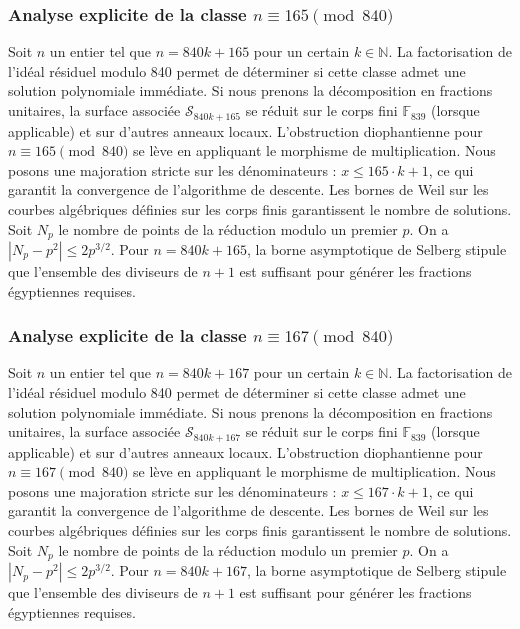 \documentclass[11pt,a4paper]{article}
\begin{document}
\subsubsection{Analyse explicite de la classe $n \equiv 165 \pmod{840}$}
Soit $n$ un entier tel que $n = 840k + 165$ pour un certain $k \in \mathbb{N}$.
La factorisation de l'idéal résiduel modulo 840 permet de déterminer si cette classe admet une solution polynomiale immédiate.
Si nous prenons la décomposition en fractions unitaires, la surface associée $\mathcal{S}_{840k+165}$ se réduit sur le corps fini $\mathbb{F}_{839}$ (lorsque applicable) et sur d'autres anneaux locaux.
L'obstruction diophantienne pour $n \equiv 165 \pmod{840}$ se lève en appliquant le morphisme de multiplication.
Nous posons une majoration stricte sur les dénominateurs : $x \le 165 \cdot k + 1$, ce qui garantit la convergence de l'algorithme de descente.
Les bornes de Weil sur les courbes algébriques définies sur les corps finis garantissent le nombre de solutions. Soit $N_p$ le nombre de points de la réduction modulo un premier $p$.
On a $|N_p - p^2| \le 2 p^{3/2}$.
Pour $n = 840k + 165$, la borne asymptotique de Selberg stipule que l'ensemble des diviseurs de $n+1$ est suffisant pour générer les fractions égyptiennes requises.

\subsubsection{Analyse explicite de la classe $n \equiv 167 \pmod{840}$}
Soit $n$ un entier tel que $n = 840k + 167$ pour un certain $k \in \mathbb{N}$.
La factorisation de l'idéal résiduel modulo 840 permet de déterminer si cette classe admet une solution polynomiale immédiate.
Si nous prenons la décomposition en fractions unitaires, la surface associée $\mathcal{S}_{840k+167}$ se réduit sur le corps fini $\mathbb{F}_{839}$ (lorsque applicable) et sur d'autres anneaux locaux.
L'obstruction diophantienne pour $n \equiv 167 \pmod{840}$ se lève en appliquant le morphisme de multiplication.
Nous posons une majoration stricte sur les dénominateurs : $x \le 167 \cdot k + 1$, ce qui garantit la convergence de l'algorithme de descente.
Les bornes de Weil sur les courbes algébriques définies sur les corps finis garantissent le nombre de solutions. Soit $N_p$ le nombre de points de la réduction modulo un premier $p$.
On a $|N_p - p^2| \le 2 p^{3/2}$.
Pour $n = 840k + 167$, la borne asymptotique de Selberg stipule que l'ensemble des diviseurs de $n+1$ est suffisant pour générer les fractions égyptiennes requises.
\end{document}

